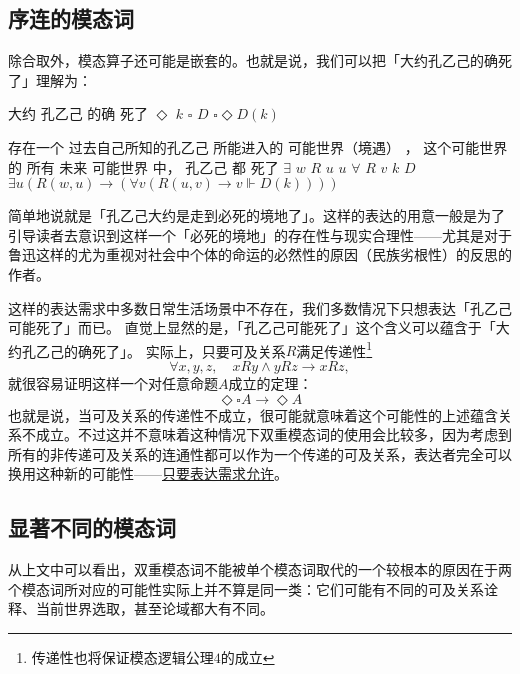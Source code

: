 \documentclass[fontset=ubuntu]{ctexart}
\begin{document}
			\subsection{序连的模态词}

				除合取外，模态算子还可能是嵌套的。也就是说，我们可以把「大约孔乙己的确死了」理解为：

				\begin{covexamples}
					\item 
						\gll 大约 孔乙己 的确 死了
							\(\Diamond\) \(k\) \(\square\) \(D\)
						\glt \(\square\Diamond D(k)\)
						\glend
					\item
						\gll 存在一个 过去自己所知的孔乙己 所能进入的 可能世界（境遇） ， 这个可能世界 的 所有 未来 可能世界 中， 孔乙己 都 死了
							\(\exists\) \(w\) \(R\) \(u\) {} \(u\) {} \(\forall\) \(R\) \(v\) {} \(k\) {} \(D\)
						\glt \(\exists u(R(w,u)\to (\forall v(R(u,v)\to v\Vdash D(k))))\)
						\glend
				\end{covexamples}

				简单地说就是「孔乙己大约是走到必死的境地了」。这样的表达的用意一般是为了引导读者去意识到这样一个「必死的境地」的存在性与现实合理性——尤其是对于鲁迅这样的尤为重视对社会中个体的命运的必然性的原因（民族劣根性）的反思的作者。

				这样的表达需求中多数日常生活场景中不存在，我们多数情况下只想表达「孔乙己可能死了」而已。
				直觉上显然的是，「孔乙己可能死了」这个含义可以蕴含于「大约孔乙己的确死了」。
				实际上，只要可及关系\(R\)满足传递性\footnote{传递性也将保证模态逻辑公理\(4\)的成立}
				\begin{equation}\label{eq:modal_kripke_trans}
					\forall x,y,z,\quad xRy\land yRz\to xRz,
				\end{equation}
				就很容易证明这样一个对任意命题\(A\)成立的定理：
				\begin{equation}
					\Diamond\square A\to\Diamond A
				\end{equation}
				也就是说，当可及关系的传递性不成立，很可能就意味着这个可能性的上述蕴含关系不成立。不过这并不意味着这种情况下双重模态词的使用会比较多，因为考虑到所有的非传递可及关系的连通性都可以作为一个传递的可及关系，表达者完全可以换用这种新的可能性——\underline{只要表达需求允许}。

			\subsection{显著不同的模态词}

				从上文中可以看出，双重模态词不能被单个模态词取代的一个较根本的原因在于两个模态词所对应的可能性实际上并不算是同一类：它们可能有不同的可及关系诠释、当前世界选取，甚至论域都大有不同。
\end{document}
